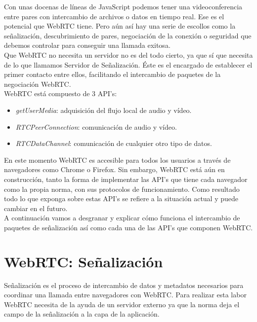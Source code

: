 Con unas docenas de líneas de JavaScript podemos tener una videoconferencia entre pares con intercambio de archivos o datos en tiempo real. Ese es el potencial que WebRTC tiene. Pero aún así hay una serie de escollos como la señalización, descubrimiento de pares, negociación de la conexión o seguridad que debemos controlar para conseguir una llamada exitosa.\\

Que WebRTC no necesita un servidor no es del todo cierto, ya que sí que necesita de lo que llamamos Servidor de Señalización. Éste es el encargado de establecer el primer contacto entre ellos, facilitando el intercambio de paquetes de la negociación WebRTC.\\

\noindent WebRTC está compuesto de 3 API's:

\begin{itemize}
\item \emph{getUserMedia}: adquisición del flujo local de audio y vídeo.
\item \emph{RTCPeerConnection}: comunicación de audio y vídeo.
\item \emph{RTCDataChannel}: comunicación de cualquier otro tipo de datos.
\end{itemize}

En este momento WebRTC es accesible para todos los usuarios a través de navegadores como Chrome o Firefox. Sin embargo, WebRTC está aún en construcción, tanto la forma de implementar las API's que tiene cada navegador como la propia norma, con sus protocolos de funcionamiento. Como resultado todo lo que exponga sobre estas API's se refiere a la situación actual y puede cambiar en el futuro.\\

A continuación vamos a desgranar y explicar cómo funciona el intercambio de paquetes de señalización así como cada una de las API's que componen WebRTC.\\

\section{WebRTC: Señalización} 
\label{sec:senalizacion}

Señalización es el proceso de intercambio de datos y metadatos necesarios para coordinar una llamada entre navegadores con WebRTC. Para realizar esta labor WebRTC necesita de la ayuda de un servidor externo ya que la norma deja el campo de la señalización a la capa de la aplicación.\\

